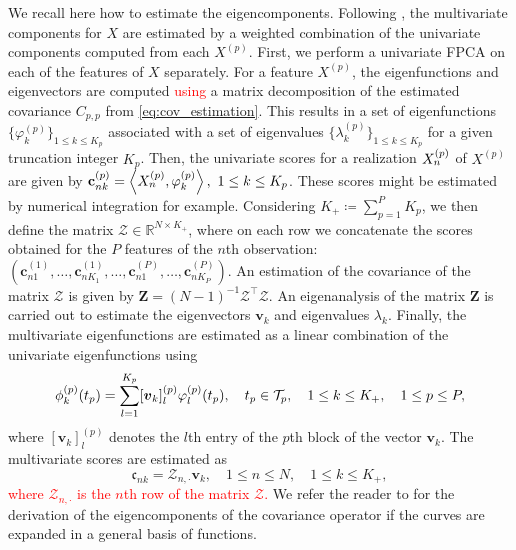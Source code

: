 We recall here how to estimate the eigencomponents. Following \citet[Prop.~5]{happMultivariateFunctionalPrincipal2018a}, the multivariate components for $X$ are estimated by a weighted combination of the univariate components computed from each $X^{(p)}$. First, we perform a univariate FPCA on each of the features of $X$ separately. For a feature $X^{(p)}$, the eigenfunctions and eigenvectors are computed \textcolor{red}{using} a matrix decomposition of the estimated covariance $C_{p, p}$ from \eqref{eq:cov_estimation}. This results in a set of eigenfunctions $\{\varphi_k^{(p)}\}_{1 \leq k \leq K_p}$ associated with a set of eigenvalues $\{\lambda_k^{(p)}\}_{1 \leq k \leq K_p}$ for a given truncation integer $K_p$. Then, the univariate scores for a realization $X_n^{(p)}$ of $X^{(p)}$ are given by $\mathbf{c}_{nk}^{(p)} = \left\langle X_n^{(p)}, \varphi_k^{(p)}\right\rangle, ~1 \leq k \leq K_p$. These scores might be estimated by numerical integration for example. Considering $K_+ \coloneqq \sum_{p = 1}^P K_p$, we then define the matrix $\mathcal{Z} \in \mathbb{R}^{N \times K_+}$, where on each row we concatenate the scores obtained for the $P$ features of the $n$th observation: 
$(\mathbf{c}_{n1}^{(1)}, \ldots, \mathbf{c}_{nK_1}^{(1)}, \ldots, \mathbf{c}_{n1}^{(P)}, \ldots, \mathbf{c}_{nK_P}^{(P)})$. An estimation of the covariance of the matrix $\mathcal{Z}$ is given by $\mathbf{Z} = (N - 1)^{-1}\mathcal{Z}^\top\mathcal{Z}$. An eigenanalysis of the matrix $\mathbf{Z}$ is carried out to estimate the eigenvectors $\boldsymbol{v}_k$ and eigenvalues $\lambda_k$. Finally, the multivariate eigenfunctions are estimated as a linear combination of the univariate eigenfunctions using
\begin{equation*}
\phi_k^{(p)}(t_p) = \sum_{l = 1}^{K_p}[\boldsymbol{v}_k]_{l}^{(p)}\varphi_{l}^{(p)}(t_p),\quad t_p \in \mathcal{T}_{p},\quad 1 \leq k \leq K_+,\quad 1 \leq p \leq P,
\end{equation*}
where $[\boldsymbol{v}_k]^{(p)}_{l}$ denotes the $l$th entry of the $p$th block of the vector $\boldsymbol{v}_k$. The multivariate scores are estimated as
$$\mathfrak{c}_{nk} = \mathcal{Z}_{{n,\cdot}}\boldsymbol{v}_k, \quad 1 \leq n \leq N, \quad 1 \leq k \leq K_+,$$
\textcolor{red}{where $\mathcal{Z}_{{n,\cdot}}$ is the $n$th row of the matrix $\mathcal{Z}$.}
We refer the reader to \cite{happMultivariateFunctionalPrincipal2018a} for the derivation of the eigencomponents of the covariance operator if the curves are expanded in a general basis of functions.


